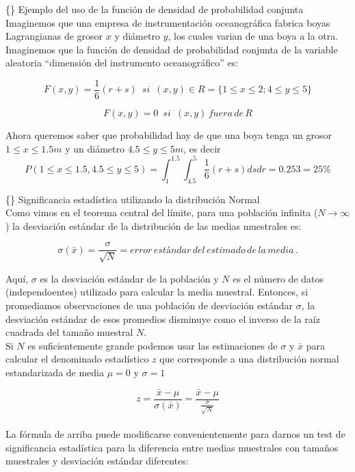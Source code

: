 \documentclass[
]{agujournal2019}
\begin{document}
\{\noindent\} Ejemplo del uso de la función de densidad de probabilidad
conjunta\\

Imaginemos que una empresa de instrumentación oceanográfica fabrica
boyas Lagrangianas de grosor \(x\) y diámetro \(y\), los cuales varian
de una boya a la otra. Imaginemos que la función de densidad de
probabilidad conjunta de la variable aleatoria ``dimensión del
instrumento oceanográfico'' es:

\[F(x,y)=\frac{1}{6}(r+s)\,\,\,si\,\,\,(x,y)\in R=\{1\le x \le 2 ; 4 \le y \le 5\}\]

\[F(x,y)=0\,\,\,si\,\,\,(x,y)\,fuera\,de\,R\]

Ahora queremos saber que probabilidad hay de que una boya tenga un
grosor \(1 \le x \le 1.5m\) y un diámetro \(4.5 \le y \le 5m\), es decir
\[P(1 \le x \le 1.5, 4.5 \le y \le 5)=\int^{1.5}_{1} \int^{5}_{4.5} \frac{1}{6}(r+s) ds dr = 0.253= 25\%\]

\vspace{0.5cm}

\{\noindent\} Significancia estadística utilizando la distribución
Normal\\

Como vimos en el teorema central del límite, para una población infinita
(\(N\rightarrow\infty\)) la desviación estándar de la distribución de
las medias muestrales es:

\[\sigma(\bar{x})=\frac{\sigma}{\sqrt{N}}=error\,estándar\,del\,estimado\,de\,la\,media\,.\]

Aquí, \(\sigma\) es la desviación estándar de la población y \(N\) es el
número de datos (independoentes) utilizado para calcular la media
muestral. Entonces, si promediamos observaciones de una población de
desviación estándar \(\sigma\), la desviación estándar de esos promedios
disminuye como el inverso de la raíz cuadrada del tamaño muestral
\(N\).\\

Si \(N\) es suficientemente grande podemos usar las estimaciones de
\(\sigma\) y \(\bar{x}\) para calcular el denominado estadístico \(z\)
que corresponde a una distribución normal estandarizada de media
\(\mu=0\) y \(\sigma=1\)

\[z=\frac{\bar{x}-\mu}{\sigma(\bar{x})}=\frac{\bar{x}-\mu}{\frac{\sigma}{\sqrt{N}}}\]\\

La fórmula de arriba puede modificarse convenientemente para darnos un
test de significancia estadística para la diferencia entre medias
muestrales con tamaños muestrales y desviación estándar diferentes:
\end{document}
